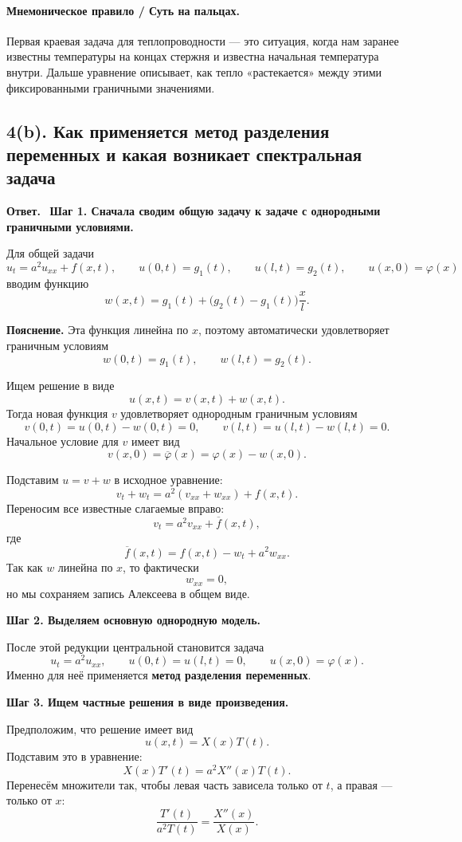 \documentclass[a4paper,12pt]{article}
\newcommand{\Answer}{\textbf{Ответ.}\ }
\begin{document}
\paragraph{Мнемоническое правило / Суть на пальцах.}
Первая краевая задача для теплопроводности --- это ситуация, когда нам заранее известны температуры на концах стержня и известна начальная температура внутри. Дальше уравнение описывает, как тепло «растекается» между этими фиксированными граничными значениями.

\subsection*{4(b). Как применяется метод разделения переменных и какая возникает спектральная задача}

\Answer
\textbf{Шаг 1. Сначала сводим общую задачу к задаче с однородными граничными условиями.}

Для общей задачи
\[
u_t=a^2u_{xx}+f(x,t),
\qquad
u(0,t)=g_1(t),
\qquad
u(l,t)=g_2(t),
\qquad
u(x,0)=\varphi(x)
\]
вводим функцию
\[
w(x,t)=g_1(t)+\bigl(g_2(t)-g_1(t)\bigr)\frac{x}{l}.
\]

\textbf{Пояснение.} Эта функция линейна по $x$, поэтому автоматически удовлетворяет граничным условиям
\[
w(0,t)=g_1(t),
\qquad
w(l,t)=g_2(t).
\]

Ищем решение в виде
\[
u(x,t)=v(x,t)+w(x,t).
\]
Тогда новая функция $v$ удовлетворяет однородным граничным условиям
\[
v(0,t)=u(0,t)-w(0,t)=0,
\qquad
v(l,t)=u(l,t)-w(l,t)=0.
\]
Начальное условие для $v$ имеет вид
\[
v(x,0)=\overline{\varphi}(x)=\varphi(x)-w(x,0).
\]

Подставим $u=v+w$ в исходное уравнение:
\[
v_t+w_t=a^2(v_{xx}+w_{xx})+f(x,t).
\]
Переносим все известные слагаемые вправо:
\[
v_t=a^2v_{xx}+\overline f(x,t),
\]
где
\[
\overline f(x,t)=f(x,t)-w_t+a^2w_{xx}.
\]
Так как $w$ линейна по $x$, то фактически
\[
w_{xx}=0,
\]
но мы сохраняем запись Алексеева в общем виде.

\textbf{Шаг 2. Выделяем основную однородную модель.}

После этой редукции центральной становится задача
\[
u_t=a^2u_{xx},
\qquad
u(0,t)=u(l,t)=0,
\qquad
u(x,0)=\varphi(x).
\]
Именно для неё применяется \textbf{метод разделения переменных}.

\textbf{Шаг 3. Ищем частные решения в виде произведения.}

Предположим, что решение имеет вид
\[
u(x,t)=X(x)T(t).
\]
Подставим это в уравнение:
\[
X(x)T'(t)=a^2X''(x)T(t).
\]
Перенесём множители так, чтобы левая часть зависела только от $t$, а правая --- только от $x$:
\[
\frac{T'(t)}{a^2T(t)}=\frac{X''(x)}{X(x)}.
\]
\end{document}
